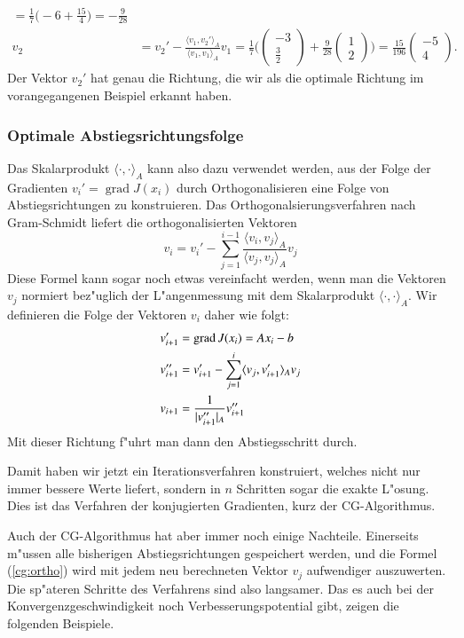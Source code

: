 \begin{beispiel}
\begin{align*}
=\frac17\biggl(-6+\frac{15}{4}\biggr)
=-\frac9{28}
\\
v_2&=
v_2'-\frac{\langle v_1,v_2'\rangle_A}{\langle v_1,v_1\rangle_A}v_1
=
\frac17\biggl(
\begin{pmatrix}-3\\\frac32\end{pmatrix}
+\frac9{28}
\begin{pmatrix}1\\2\end{pmatrix}
\biggr)
=
\frac{15}{196}\begin{pmatrix}-5\\4\end{pmatrix}.
\end{align*}
Der Vektor $v_2'$ hat genau die Richtung, die wir als die optimale
Richtung im vorangegangenen Beispiel erkannt haben.
\end{beispiel}

\subsubsection{Optimale Abstiegsrichtungsfolge}
Das Skalarprodukt $\langle\cdot,\cdot\rangle_A$ kann also dazu verwendet
werden, aus der Folge der Gradienten $v_i'=\operatorname{grad}J(x_i)$
durch Orthogonalisieren eine Folge von Abstiegsrichtungen zu 
konstruieren.
Das Orthogonalsierungsverfahren nach Gram-Schmidt liefert die
orthogonalisierten Vektoren
\[
v_i=v_i' - \sum_{j=1}^{i-1}\frac{\langle v_i,v_j\rangle_A}{\langle v_j,v_j\rangle_A}v_j
\]
Diese Formel kann sogar noch etwas vereinfacht werden, wenn man die
Vektoren $v_j$ normiert bez"uglich der L"angenmessung mit dem Skalarprodukt
$\langle\cdot,\cdot\rangle_A$.
Wir definieren die Folge der Vektoren $v_i$ daher wie folgt:
\begin{align}
v_{i+1}'&=\operatorname{grad}J(x_i)=Ax_i-b
\notag\\
v_{i+1}''&=v_{i+1}'-\sum_{j=1}^{i}\langle v_j,v_{i+1}'\rangle_A v_j
\label{cg:ortho}
\\
v_{i+1}&=\frac1{|v_{i+1}''|_A}v_{i+1}''
\notag
\end{align}
Mit dieser Richtung f"uhrt man dann den Abstiegsschritt durch.

Damit haben wir jetzt ein Iterationsverfahren konstruiert, welches nicht
nur immer bessere Werte liefert, sondern in $n$ Schritten sogar die exakte
L"osung.
Dies ist das Verfahren der konjugierten Gradienten, kurz der CG-Algorithmus.

Auch der CG-Algorithmus hat aber immer noch einige Nachteile.
Einerseits m"ussen alle bisherigen
Abstiegsrichtungen gespeichert werden, und die Formel (\ref{cg:ortho}) wird
mit jedem neu berechneten Vektor $v_j$ aufwendiger auszuwerten.
Die sp"ateren Schritte des Verfahrens sind also langsamer.
Das es auch bei der Konvergenzgeschwindigkeit noch Verbesserungspotential
gibt, zeigen die folgenden Beispiele.

